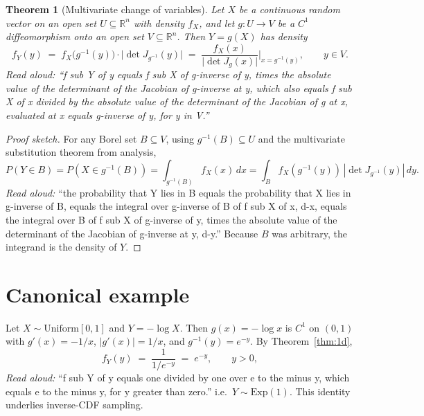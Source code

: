 \documentclass[11pt]{article}
\newtheorem{theorem}{Theorem}
\begin{document}
\begin{theorem}[Multivariate change of variables]
\label{thm:multi}
Let $X$ be a continuous random vector on an open set $U \subseteq \mathbb{R}^n$ with
density $f_X$, and let $g : U \to V$ be a $C^1$ diffeomorphism onto an open set
$V \subseteq \mathbb{R}^n$. Then $Y = g(X)$ has density
\[
f_Y(y) \;=\; f_X\!\bigl(g^{-1}(y)\bigr) \cdot \bigl|\det J_{g^{-1}}(y)\bigr|
\;=\; \frac{f_X(x)}{\bigl|\det J_g(x)\bigr|}\bigg|_{x = g^{-1}(y)},
\qquad y \in V.
\]
\emph{Read aloud:} ``f sub Y of y equals f sub X of g-inverse of y, times the absolute value of the determinant of the Jacobian of g-inverse at y, which also equals f sub X of x divided by the absolute value of the determinant of the Jacobian of g at x, evaluated at x equals g-inverse of y, for y in V.''
\end{theorem}

\begin{proof}[Proof sketch]
For any Borel set $B \subseteq V$, using $g^{-1}(B) \subseteq U$ and the multivariate
substitution theorem from analysis,
\[
P(Y \in B) = P(X \in g^{-1}(B)) = \int_{g^{-1}(B)} f_X(x)\, dx
= \int_B f_X(g^{-1}(y))\,|\det J_{g^{-1}}(y)|\,dy.
\]
\emph{Read aloud:} ``the probability that Y lies in B equals the probability that X lies in g-inverse of B, equals the integral over g-inverse of B of f sub X of x, d-x, equals the integral over B of f sub X of g-inverse of y, times the absolute value of the determinant of the Jacobian of g-inverse at y, d-y.''
Because $B$ was arbitrary, the integrand is the density of $Y$.
\end{proof}

\section{Canonical example}

Let $X \sim \mathrm{Uniform}[0,1]$ and $Y = -\log X$. Then $g(x) = -\log x$ is
$C^1$ on $(0,1)$ with $g'(x) = -1/x$, $|g'(x)| = 1/x$, and $g^{-1}(y) = e^{-y}$.
By Theorem~\ref{thm:1d},
\[
f_Y(y) \;=\; \frac{1}{1/e^{-y}} \;=\; e^{-y}, \qquad y > 0,
\]
\emph{Read aloud:} ``f sub Y of y equals one divided by one over e to the minus y, which equals e to the minus y, for y greater than zero.''
i.e.\ $Y \sim \mathrm{Exp}(1)$. This identity underlies inverse-CDF sampling.
\end{document}
